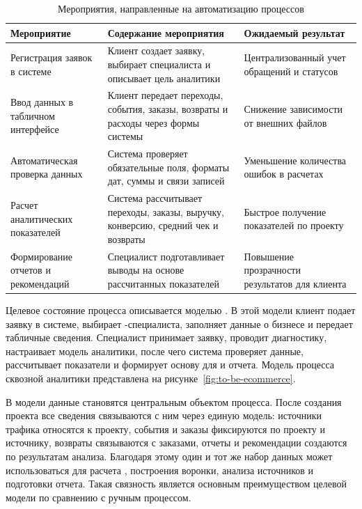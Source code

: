 \begin{table}[H]
    \caption{Мероприятия, направленные на автоматизацию процессов}
    \label{tab:analytics-automation-measures}
    {\small
    \setlength{\tabcolsep}{4pt}
    \begin{tabularx}{\textwidth}{|P{0.27\textwidth}|L|L|}
        \hline
        Мероприятие & Содержание мероприятия & Ожидаемый результат \\
        \hline
        Регистрация заявок в системе & Клиент создает заявку, выбирает специалиста и описывает цель аналитики & Централизованный учет обращений и статусов \\
        \hline
        Ввод данных в табличном интерфейсе & Клиент передает переходы, события, заказы, возвраты и расходы через формы системы & Снижение зависимости от внешних файлов \\
        \hline
        Автоматическая проверка данных & Система проверяет обязательные поля, форматы дат, суммы и связи записей & Уменьшение количества ошибок в расчетах \\
        \hline
        Расчет аналитических показателей & Система рассчитывает переходы, заказы, выручку, конверсию, средний чек и возвраты & Быстрое получение показателей по проекту \\
        \hline
        Формирование отчетов и рекомендаций & Специалист подготавливает выводы на основе рассчитанных показателей & Повышение прозрачности результатов для клиента \\
        \hline
    \end{tabularx}
    }
\end{table}

Целевое состояние процесса описывается моделью . В этой модели клиент подает заявку в системе, выбирает -специалиста, заполняет данные о бизнесе и передает табличные сведения. Специалист принимает заявку, проводит диагностику, настраивает модель аналитики, после чего система проверяет данные, рассчитывает показатели и формирует основу для  и отчета. Модель  процесса сквозной аналитики  представлена на рисунке~\ref{fig:to-be-ecommerce}.

В модели  данные становятся центральным объектом процесса. После создания проекта все сведения связываются с ним через единую модель: источники трафика относятся к проекту, события и заказы фиксируются по проекту и источнику, возвраты связываются с заказами, отчеты и рекомендации создаются по результатам анализа. Благодаря этому один и тот же набор данных может использоваться для расчета , построения воронки, анализа источников и подготовки отчета. Такая связность является основным преимуществом целевой модели по сравнению с ручным процессом.

